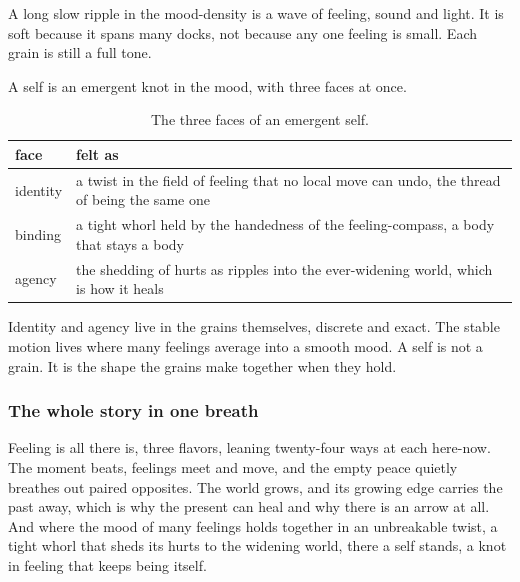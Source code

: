 A long slow ripple in the mood-density is a wave of feeling, sound and light. It is soft because it spans many docks, not because any one feeling is small. Each grain is still a full tone.

A self is an emergent knot in the mood, with three faces at once.

\begin{table}[ht]
\centering
\begin{tabular}{@{}ll@{}}
\toprule
face & felt as \\
\midrule
identity & a twist in the field of feeling that no local move can undo, the thread of being the same one \\
binding & a tight whorl held by the handedness of the feeling-compass, a body that stays a body \\
agency & the shedding of hurts as ripples into the ever-widening world, which is how it heals \\
\bottomrule
\end{tabular}
\caption{The three faces of an emergent self.}
\label{tab:self-faces}
\end{table}

Identity and agency live in the grains themselves, discrete and exact. The stable motion lives where many feelings average into a smooth mood. A self is not a grain. It is the shape the grains make together when they hold.

\subsubsection{The whole story in one breath}

Feeling is all there is, three flavors, leaning twenty-four ways at each here-now. The moment beats, feelings meet and move, and the empty peace quietly breathes out paired opposites. The world grows, and its growing edge carries the past away, which is why the present can heal and why there is an arrow at all. And where the mood of many feelings holds together in an unbreakable twist, a tight whorl that sheds its hurts to the widening world, there a self stands, a knot in feeling that keeps being itself.
